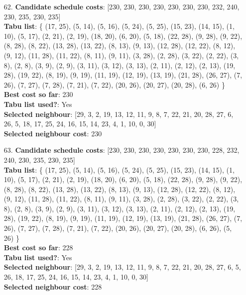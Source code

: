 \documentclass[fleqn]{article}
\begin{document}
\begin{itemize}
    \item[62.] \textbf{Candidate schedule costs}: [230, 230, 230, 230, 230, 230, 230, 232, 240, 230, 235, 230, 235] \\
    \textbf{Tabu list}: \{ (17, 25), (5, 14), (5, 16), (5, 24), (5, 25), (15, 23), (14, 15), (1, 10), (5, 17), (2, 21), (2, 19), (18, 20), (6, 20), (5, 18), (22, 28), (9, 28), (9, 22), (8, 28), (8, 22), (13, 28), (13, 22), (8, 13), (9, 13), (12, 28), (12, 22), (8, 12), (9, 12), (11, 28), (11, 22), (8, 11), (9, 11), (3, 28), (2, 28), (3, 22), (2, 22), (3, 8), (2, 8), (3, 9), (2, 9), (3, 11), (3, 12), (3, 13), (2, 11), (2, 12), (2, 13), (19, 28), (19, 22), (8, 19), (9, 19), (11, 19), (12, 19), (13, 19), (21, 28), (26, 27), (7, 26), (7, 27), (7, 28), (7, 21), (7, 22), (20, 26), (20, 27), (20, 28), (6, 26) \} \\
    \textbf{Best cost so far}: 230 \\
    \textbf{Tabu list used?}: Yes \\
    \textbf{Selected neighbour}: [29, 3, 2, 19, 13, 12, 11, 9, 8, 7, 22, 21, 20, 28, 27, 6, 26, 5, 18, 17, 25, 24, 16, 15, 14, 23, 4, 1, 10, 0, 30] \\
    \textbf{Selected neighbour cost}: 230
      

    \item[63.] \textbf{Candidate schedule costs}: [230, 230, 230, 230, 230, 230, 230, 228, 232, 240, 230, 235, 230, 235] \\
    \textbf{Tabu list}: \{ (17, 25), (5, 14), (5, 16), (5, 24), (5, 25), (15, 23), (14, 15), (1, 10), (5, 17), (2, 21), (2, 19), (18, 20), (6, 20), (5, 18), (22, 28), (9, 28), (9, 22), (8, 28), (8, 22), (13, 28), (13, 22), (8, 13), (9, 13), (12, 28), (12, 22), (8, 12), (9, 12), (11, 28), (11, 22), (8, 11), (9, 11), (3, 28), (2, 28), (3, 22), (2, 22), (3, 8), (2, 8), (3, 9), (2, 9), (3, 11), (3, 12), (3, 13), (2, 11), (2, 12), (2, 13), (19, 28), (19, 22), (8, 19), (9, 19), (11, 19), (12, 19), (13, 19), (21, 28), (26, 27), (7, 26), (7, 27), (7, 28), (7, 21), (7, 22), (20, 26), (20, 27), (20, 28), (6, 26), (5, 26) \} \\
    \textbf{Best cost so far}: 228 \\
    \textbf{Tabu list used?}: Yes \\
    \textbf{Selected neighbour}: [29, 3, 2, 19, 13, 12, 11, 9, 8, 7, 22, 21, 20, 28, 27, 6, 5, 26, 18, 17, 25, 24, 16, 15, 14, 23, 4, 1, 10, 0, 30] \\
    \textbf{Selected neighbour cost}: 228
      


\end{itemize}
\end{document}
